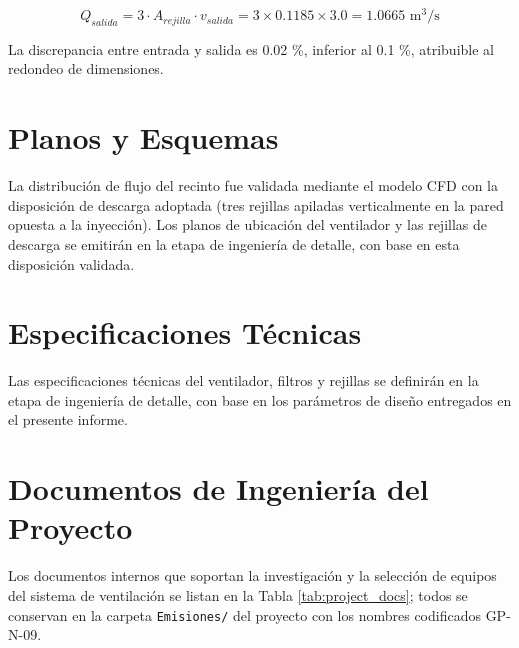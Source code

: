 \begin{equation}
	Q_{salida} = 3 \cdot A_{rejilla} \cdot v_{salida} = 3 \times 0.1185 \times 3.0 = 1.0665 \text{ m}^3/\text{s}
\end{equation}

La discrepancia entre entrada y salida es 0.02 \%, inferior al 0.1 \%, atribuible al redondeo de dimensiones.

\section{Planos y Esquemas}
\label{appendix:drawings}

La distribución de flujo del recinto fue validada mediante el modelo CFD con la disposición de descarga adoptada (tres rejillas apiladas verticalmente en la pared opuesta a la inyección). Los planos de ubicación del ventilador y las rejillas de descarga se emitirán en la etapa de ingeniería de detalle, con base en esta disposición validada.

\section{Especificaciones Técnicas}
\label{appendix:specs}

Las especificaciones técnicas del ventilador, filtros y rejillas se definirán en la etapa de ingeniería de detalle, con base en los parámetros de diseño entregados en el presente informe.

\section{Documentos de Ingeniería del Proyecto}
\label{appendix:doclist}

Los documentos internos que soportan la investigación y la selección de equipos del sistema de ventilación se listan en la Tabla \ref{tab:project_docs}; todos se conservan en la carpeta \texttt{Emisiones/} del proyecto con los nombres codificados GP-N-09.

